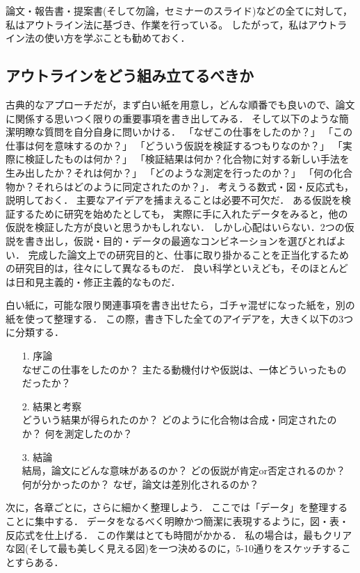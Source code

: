 \documentclass[twocolumn, 10pt,a4j]{jarticle}
\begin{document}
    論文・報告書・提案書(そして勿論，セミナーのスライド)などの全てに対して，私はアウトライン法に基づき、作業を行っている。
    したがって，私はアウトライン法の使い方を学ぶことも勧めておく．

    \subsection{アウトラインをどう組み立てるべきか}
    古典的なアプローチだが，まず白い紙を用意し，どんな順番でも良いので、論文に関係する思いつく限りの重要事項を書き出してみる．
    そして以下のような簡潔明瞭な質問を自分自身に問いかける．
    「なぜこの仕事をしたのか？」
    「この仕事は何を意味するのか？」
    「どういう仮説を検証するつもりなのか？」
    「実際に検証したものは何か？」
    「検証結果は何か？化合物に対する新しい手法を生み出したか？それは何か？」
    「どのような測定を行ったのか？」
    「何の化合物か？それらはどのように同定されたのか？」．
    考えうる数式・図・反応式も，説明しておく．
    主要なアイデアを捕まえることは必要不可欠だ．
    ある仮説を検証するために研究を始めたとしても，
    実際に手に入れたデータをみると，他の仮説を検証した方が良いと思うかもしれない．
    しかし心配はいらない．2つの仮説を書き出し，仮説・目的・データの最適なコンビネーションを選びとればよい．
    完成した論文上での研究目的と、仕事に取り掛かることを正当化するための研究目的は，往々にして異なるものだ．
    良い科学といえども，そのほとんどは日和見主義的・修正主義的なものだ．

    白い紙に，可能な限り関連事項を書き出せたら，ゴチャ混ぜになった紙を，別の紙を使って整理する．
    この際，書き下した全てのアイデアを，大きく以下の3つに分類する．

    \begin{itemize}
      \item[1.] \mbox{序論}\\ 
      なぜこの仕事をしたのか？
      主たる動機付けや仮説は、一体どういったものだったか？
      \item[2.] \mbox{結果と考察}\\
      どういう結果が得られたのか？
      どのように化合物は合成・同定されたのか？
      何を測定したのか？
      \item[3.] \mbox{結論}\\ 
      結局，論文にどんな意味があるのか？
      どの仮説が肯定or否定されるのか？
      何が分かったのか？
      なぜ，論文は差別化されるのか？
    \end{itemize}

    次に，各章ごとに，さらに細かく整理しよう．
    ここでは「データ」を整理することに集中する．
    データをなるべく明瞭かつ簡潔に表現するように，図・表・反応式を仕上げる．
    この作業はとても時間がかかる．
    私の場合は，最もクリアな図(そして最も美しく見える図)を一つ決めるのに，5-10通りをスケッチすることすらある．
\end{document}
